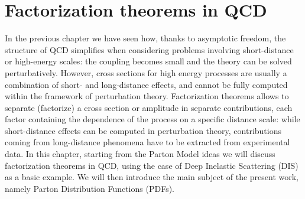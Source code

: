 \chapter{Factorization theorems in QCD}
\label{ch:fact}
In the previous chapter we have seen how, thanks to asymptotic freedom, the structure of QCD simplifies when considering problems
involving short-distance or high-energy scales: the coupling becomes small and the theory can be solved perturbatively.
However, cross sections for high energy processes are usually a combination of short- and long-distance effects, and cannot
be fully computed within the framework of perturbation theory. Factorization theorems allows to separate (factorize) a cross section
or amplitude in separate contributions, each factor containing the dependence of the process on a specific distance scale:
while short-distance effects can be computed in perturbation theory, contributions coming from long-distance phenomena have
to be extracted from experimental data. 
In this chapter, starting from the Parton Model ideas we will discuss factorization theorems in QCD,
using the case of Deep Inelastic Scattering (DIS) as a basic example. We will then introduce the main subject of the
present work, namely Parton Distribution Functions (PDFs).

